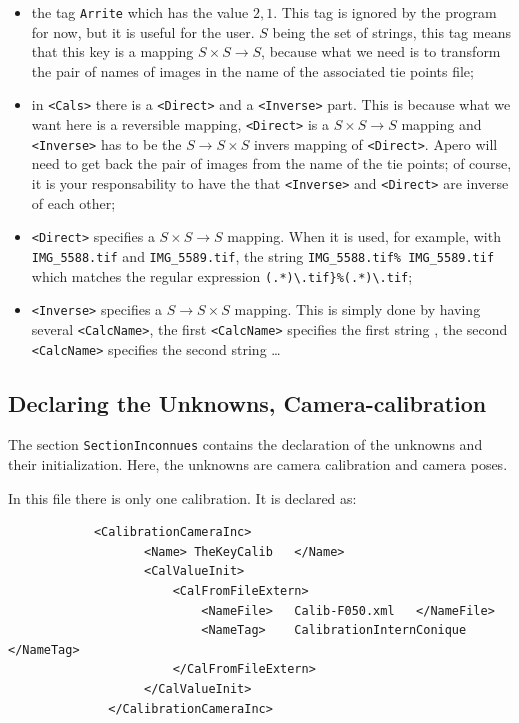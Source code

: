\begin{itemize}
   \item  the tag {\tt Arrite} which has the value $2 , 1$. This tag is ignored by the program
          for now, but it is useful for the user.
          $S$ being the set of strings, this tag means  that this key is a mapping $S\times S\rightarrow S$,
          because what we need is to transform the pair of names of images in the name of
          the associated tie points file;

   \item  in {\tt <Cals>}  there is a {\tt <Direct>} and a {\tt <Inverse>}
          part. This is because what we want here is a reversible mapping, {\tt <Direct>} 
          is a $S\times S\rightarrow S$ mapping and {\tt <Inverse>} has to be the $S\rightarrow S\times S$ 
          invers mapping of  {\tt <Direct>}. Apero will need to get back
          the pair of images from the name of the tie points; of course, it is your responsability
          to have the  that {\tt <Inverse>}  and  {\tt <Direct>} are inverse
          of each other;

    \item {\tt <Direct>} specifies a $S\times S\rightarrow S$ mapping. When it is used, for example, with
          {\tt IMG\_5588.tif}  and {\tt IMG\_5589.tif}, the string {\tt IMG\_5588.tif\% IMG\_5589.tif}
          which matches the regular expression {\tt  (.*)\textbackslash.tif\}\%(.*)\textbackslash.tif};
        
    \item  {\tt <Inverse>} specifies a $S\rightarrow S\times S$ mapping. This is simply
           done by having several {\tt  <CalcName>}, the first {\tt  <CalcName>} specifies
           the first string , the second {\tt  <CalcName>} specifies
           the second string \dots 

\end{itemize}

\subsection{Declaring the Unknowns, Camera-calibration}

The section {\tt SectionInconnues} contains the declaration of the 
unknowns and their initialization. Here, the unknowns are camera
calibration and camera poses.

In this file there is only one calibration. It is declared as:

{\scriptsize
\begin{verbatim}
            <CalibrationCameraInc>
                   <Name> TheKeyCalib   </Name>
                   <CalValueInit>
                       <CalFromFileExtern>
                           <NameFile>   Calib-F050.xml   </NameFile>
                           <NameTag>    CalibrationInternConique </NameTag>
                       </CalFromFileExtern>
                   </CalValueInit>
              </CalibrationCameraInc>
\end{verbatim}
}

